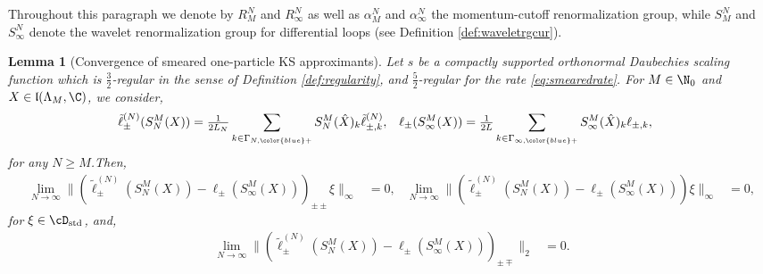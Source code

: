 \documentclass[a4paper, 11pt]{article}
\newcommand{\fl}{\mathfrak{l}}\newcommand{\cl}{\mathcal{l}}
\DeclareMathOperator{\1}{\mathds{1}}
\DeclareMathOperator{\std}{std}
\newtheorem{lemma}[thm]{Lemma}
\begin{document}
Throughout this paragraph we denote by $R^{N}_{M}$ and $R^{N}_{\infty}$ as well as $\alpha^{N}_{M}$ and $\alpha^{N}_{\infty}$ the momentum-cutoff renormalization group, while $S^{N}_{M}$ and $S^{N}_{\infty}$ denote the wavelet renormalization group for differential loops (see Definition \ref{def:waveletrgcur}).
\begin{lemma}[Convergence of smeared one-particle KS approximants]
\label{lem:KSconvsmeared}
Let $s$ be a compactly supported orthonormal Daubechies scaling function which is $\tfrac{3}{2}$-regular in the sense of Definition \ref{def:regularity}, and $\tfrac{5}{2}$-regular for the rate \eqref{eq:smearedrate}.  For $M\in\N_{0}$ and $X\in\fl(\Lambda_{M},\C)$, we consider,
\begin{align*}
\tilde{\ell}^{(N)}_{\pm}(S^{M}_{N}(X)) & = \tfrac{1}{2L_{N}}\sum_{k\in\Gamma_{N,{\color{blue}+}}}S^{M}_{N}(\hat{X})_{k}\tilde{\ell}^{(N)}_{\pm,k}, & \ell_{\pm}(S^{M}_{\infty}(X)) & = \tfrac{1}{2L}\sum_{k\in\Gamma_{\infty,{\color{blue}+}}}S^{M}_{\infty}(\hat{X})_{k}\ell_{\pm,k},
\end{align*}
for any $N\geq M$.Then,
\begin{align*}
\lim_{N\rightarrow\infty}\|(\tilde{\ell}^{(N)}_{\pm}(S^{M}_{N}(X)\!)\!-\!\ell_{\pm}(S^{M}_{\infty}(X)\!)\!)_{\pm\pm}\xi\|_{\infty} & = 0, & \lim_{N\rightarrow\infty}\|(\tilde{\ell}^{(N)}_{\pm}(S^{M}_{N}(X)\!)\!-\!\ell_{\pm}(S^{M}_{\infty}(X)\!)\!)\xi\|_{\infty} & = 0,
\end{align*}
for $\xi\in\cD_{\std}$, and,
\begin{align*}
\lim_{N\rightarrow\infty}\|(\tilde{\ell}^{(N)}_{\pm}(S^{M}_{N}(X)\!)\!-\!\ell_{\pm}(S^{M}_{\infty}(X)\!)\!)_{\pm\mp}\|_{2} & = 0.
\end{align*}
\end{lemma}
\end{document}
